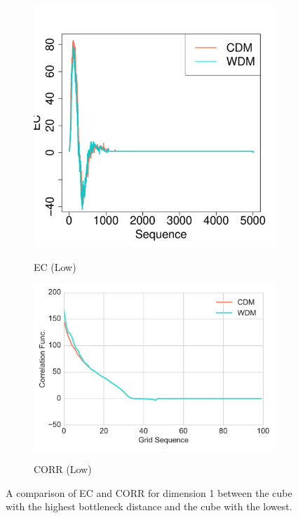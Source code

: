 \documentclass[12pt]{article}
\begin{document}
\begin{figure}[htp!]
\begin{subfigure}{0.24\textwidth}
    \label{fig:valid2}
  \end{subfigure}
    \begin{subfigure}{0.21\textwidth}
    \centering
        \caption{EC (Low)}
\includegraphics[width=\linewidth]{figure_13_min_margin_2euler.pdf}
    \label{fig:valid3}
  \end{subfigure}
    \begin{subfigure}{0.24\textwidth}
    \centering
        \caption{CORR (Low)}
\includegraphics[width=\linewidth]{figure_13_min_margin_corr.pdf}
    \label{fig:valid4}
  \end{subfigure}
    \label{fig:validationfigs}
    \caption{A comparison of EC and CORR for dimension 1 between the cube with the highest bottleneck distance and the cube with the lowest.}
\end{figure}
\end{document}

